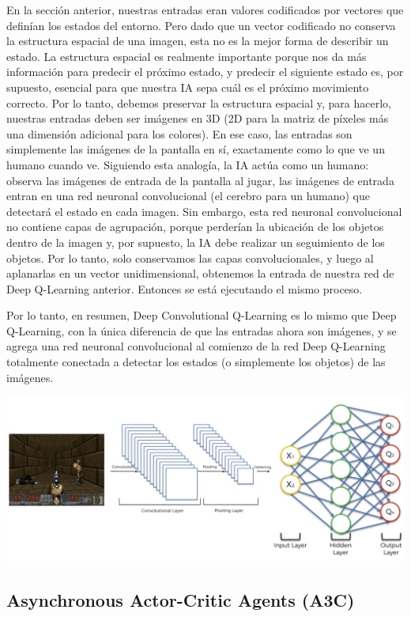 \documentclass[
]{book}
\begin{document}
En la sección anterior, nuestras entradas eran valores codificados por vectores que definían los estados del entorno. Pero dado que un vector codificado no conserva la estructura espacial de una imagen, esta no es la mejor forma de describir un estado. La estructura espacial es realmente importante porque nos da más información para predecir el próximo estado, y predecir el siguiente estado es, por supuesto, esencial para que nuestra IA sepa cuál es el próximo movimiento correcto. Por lo tanto, debemos preservar la estructura espacial y, para hacerlo, nuestras entradas deben ser imágenes en 3D (2D para la matriz de píxeles más una dimensión adicional para los colores). En ese caso, las entradas son simplemente las imágenes de la pantalla en sí, exactamente como lo que ve un humano cuando ve. Siguiendo esta analogía, la IA actúa como un humano: observa las imágenes de entrada de la pantalla al jugar, las imágenes de entrada entran en una red neuronal convolucional (el cerebro para un humano) que detectará el estado en cada imagen. Sin embargo, esta red neuronal convolucional no contiene capas de agrupación, porque perderían la ubicación de los objetos dentro de la imagen y, por supuesto, la IA debe realizar un seguimiento de los objetos. Por lo tanto, solo conservamos las capas convolucionales, y luego al aplanarlas en un vector unidimensional, obtenemos la entrada de nuestra red de Deep Q-Learning anterior. Entonces se está ejecutando el mismo proceso.

Por lo tanto, en resumen, Deep Convolutional Q-Learning es lo mismo que Deep Q-Learning, con la única diferencia de que las entradas ahora son imágenes, y se agrega una red neuronal convolucional al comienzo de la red Deep Q-Learning totalmente conectada a detectar los estados (o simplemente los objetos) de las imágenes.

\includegraphics{Images/DCQL.png}

\hypertarget{asynchronous-actor-critic-agents-a3c}{%
\subsection{Asynchronous Actor-Critic Agents (A3C)}\label{asynchronous-actor-critic-agents-a3c}}
\end{document}
